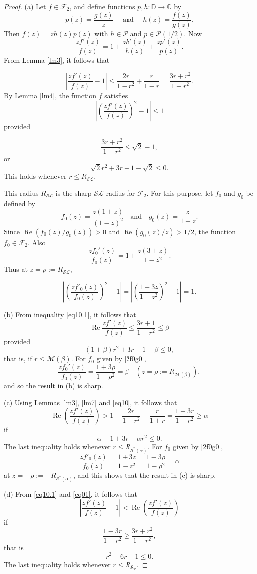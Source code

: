 \documentclass{amsart}
\begin{document}
\begin{proof}
(a) Let $f\in \mathcal{F}_2$, and
define functions $p,h:\mathbb{D}\rightarrow \mathbb{C}$ by
\[p(z)=\frac{g(z)}{z}\quad \text{ and } \quad h(z)=\frac{f(z)}{g(z)}.\]
Then $f(z)=z h(z)p(z)$ with $h \in \mathcal{P}$ and $p\in \mathcal{P}(1/2).$ Now
\begin{equation}\label{eq10}
\frac{zf'(z)}{f(z)}=1+\frac{zh'(z)}{h(z)}+\frac{zp'(z)}{p(z)}.
\end{equation}
From  Lemma \ref{lm3}, it follows that
  
\begin{equation}\label{eq10.1}
\left|\frac{zf'(z)}{f(z)}-1\right|\leq\frac{2r}{1-r^2}+\frac{r}{1-r}=\frac{3r+r^2}{1-r^2}.
\end{equation}
 By Lemma \ref{lm4}, the function $f$ satisfies
 \[ \left|\left(\frac{zf'(z)}{f(z)}\right)^2-1\right|\leq 1  \] provided
 
\[\frac{3r+r^2}{1-r^2}\leq\sqrt2-1,\] or  \[ \sqrt2r^2+3r+1-\sqrt2\leq0.\] This holds whenever   $r \leq R_{\mathcal{SL}}. $

This radius $R_{\mathcal{SL}}$ is the sharp ${\mathcal{SL}}$-radius for $\mathcal{F}_2$. For this purpose, let $f_0$ and $g_0$ be defined by
\begin{equation}\label{2f0g0}
f_0(z)=\frac{z(1+z)}{(1-z)^2}\quad \text{and} \quad g_0(z)=  \frac{z}{1-z} .
\end{equation}
Since $\operatorname{Re}\left( f_0(z)/g_0(z)\right)>0$  and $  \operatorname{Re} \left(g_0(z)/z\right)>1/2$,  the function
$f_0\in \mathcal{F}_2$. Also
\[ \frac{zf_0'(z)}{f_0(z)}= 1+\frac{z(3+z)}{1-z^2}.\]   Thus at $z=\rho:=R_{\mathcal{SL}}$,

\[ \left|\left(\frac{zf'_0(z)}{f_0(z)}\right)^2-1\right|=\left|\left(\frac{1+3z}{1-z^2}\right)^2-1\right|=1.\]

(b) From  inequality \eqref{eq10.1}, it follows that
 \[\operatorname{Re}\frac{zf'(z)}{f(z)}\leq\frac{3r+1}{1-r^2}\leq\beta\]
provided
 \[(1+\beta)r^2+3r+1-\beta\leq0,\] that is, if $r\leq{\mathcal{M}(\beta)}.$
For  $f_0$ given by \eqref{2f0g0},
\[ \frac{zf_0'(z)}{f_0(z)}= \frac{1+3\rho}{1-\rho^2}=\beta\quad ( z=\rho:=R_{\mathcal{M}(\beta)} ),\]
 and so the result in (b) is sharp.

(c) Using Lemmas \ref{lm3},  \ref{lm7} and \eqref{eq10}, it follows that
\begin{equation}\label{eq01}
\operatorname{Re}\left(\frac{zf'(z)}{f(z)}\right)>1-\frac{2r}{1-r^2}-\frac{r}{1+r}=\frac{1-3r}{1-r^2}\geq\alpha
\end{equation}
if
 \[  \alpha-1+3r-\alpha r^2  \leq0.\] The last inequality holds whenever   $r\leq R_{\mathcal{S}^*(\alpha)} $.
For  $f_0$ given by \eqref{2f0g0},
\[ \frac{zf'_0(z)}{f_0(z)}= \frac{ 1+3z}{1-z^2}=\frac{1-3\rho}{1-\rho^2}=\alpha\]
at $z=-\rho:=-R_{\mathcal{S}^*(\alpha)}$, and this shows that the result in (c) is sharp.

(d) From \eqref{eq10.1} and \eqref{eq01},  it follows that \[\left|\frac{zf'(z)}{f(z)}-1\right|<\operatorname{Re}\left(\frac{zf'(z)}{f(z)}\right) \] if
\[ \frac{1-3r}{1-r^2}\geq\frac{ 3r+r^2}{1-r^2}, \]
that is \[r^2+6r-1\leq0.\]
 The last inequality holds whenever $r\leq R_{\mathcal{S}_{\mathcal{P}}}.$
\end{proof}
\end{document}

